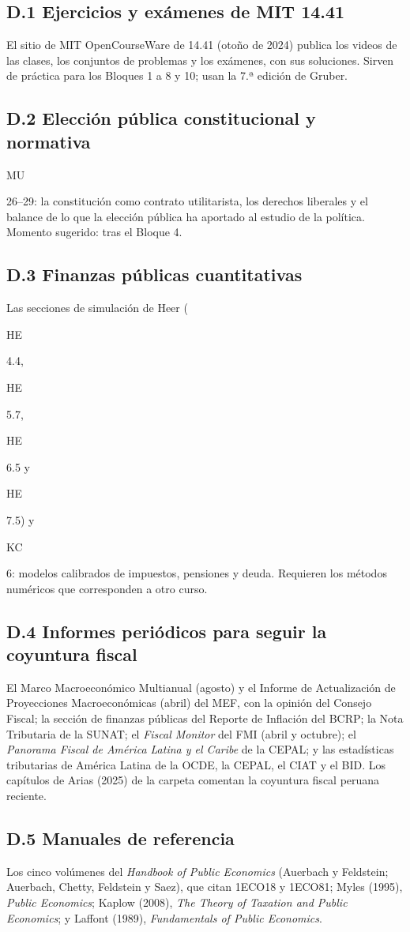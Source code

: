 \documentclass[11pt,a4paper]{article}
\newcommand{\etiqueta}[2]{%
  {\setlength{\fboxsep}{1.4pt}\colorbox{#1}{\sffamily\bfseries\color{white}\strut#2}}}
\newcommand{\MU}[1]{\etiqueta{colorMU}{MU}\nobreak\hspace{0.25em}\textcolor{colorMU}{#1}}
\newcommand{\HE}[1]{\etiqueta{colorHE}{HE}\nobreak\hspace{0.25em}\textcolor{colorHE}{#1}}
\newcommand{\KC}[1]{\etiqueta{colorKC}{KC}\nobreak\hspace{0.25em}\textcolor{colorKC}{#1}}
\begin{document}
\subsection*{D.1 Ejercicios y exámenes de MIT 14.41}
El sitio de MIT OpenCourseWare de 14.41 (otoño de 2024) publica los videos de
las clases, los conjuntos de problemas y los exámenes, con sus soluciones.
Sirven de práctica para los Bloques 1 a 8 y 10; usan la 7.ª edición de
Gruber.

\subsection*{D.2 Elección pública constitucional y normativa}
\MU{26--29}: la constitución como contrato utilitarista, los derechos
liberales y el balance de lo que la elección pública ha aportado al estudio
de la política. Momento sugerido: tras el Bloque 4.

\subsection*{D.3 Finanzas públicas cuantitativas}
Las secciones de simulación de Heer (\HE{4.4}, \HE{5.7}, \HE{6.5} y \HE{7.5})
y \KC{6}: modelos calibrados de impuestos, pensiones y deuda. Requieren los
métodos numéricos que corresponden a otro curso.

\subsection*{D.4 Informes periódicos para seguir la coyuntura fiscal}
El Marco Macroeconómico Multianual (agosto) y el Informe de Actualización de
Proyecciones Macroeconómicas (abril) del MEF, con la opinión del Consejo
Fiscal; la sección de finanzas públicas del Reporte de Inflación del BCRP; la
Nota Tributaria de la SUNAT; el \emph{Fiscal Monitor} del FMI (abril y
octubre); el \emph{Panorama Fiscal de América Latina y el Caribe} de la
CEPAL; y las estadísticas tributarias de América Latina de la OCDE, la CEPAL,
el CIAT y el BID. Los capítulos de Arias (2025) de la carpeta comentan la
coyuntura fiscal peruana reciente.

\subsection*{D.5 Manuales de referencia}
Los cinco volúmenes del \emph{Handbook of Public Economics} (Auerbach y
Feldstein; Auerbach, Chetty, Feldstein y Saez), que citan 1ECO18 y 1ECO81;
Myles (1995), \emph{Public Economics}; Kaplow (2008), \emph{The Theory of
Taxation and Public Economics}; y Laffont (1989), \emph{Fundamentals of Public
Economics}.
\end{document}
